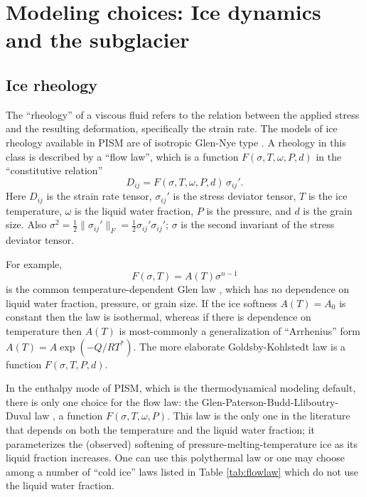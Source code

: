 
\section{Modeling choices:  Ice dynamics and the subglacier}
\label{sec:modeling-dynamics}

\subsection{Ice rheology}
\label{sec:rheology}

The ``rheology'' of a viscous fluid refers to the relation between the applied stress and the resulting deformation, specifically the strain rate.  The models of ice rheology available in PISM are of isotropic Glen-Nye type \cite{Paterson}.   A rheology in this class is described by a ``flow law'', which is a function $F(\sigma,T,\omega,P,d)$ in the ``constitutive relation''
\begin{equation}
D_{ij} = F(\sigma,T,\omega,P,d)\, \sigma_{ij}'.  \label{eq:constitutive}
\end{equation}
Here $D_{ij}$ is the strain rate tensor, $\sigma_{ij}'$ is the stress deviator tensor, $T$ is the ice temperature, $\omega$ is the liquid water fraction, $P$ is the pressure, and $d$ is the grain size.  Also $\sigma^2 = \frac{1}{2} \|\sigma_{ij}'\|_F = \frac{1}{2} \sigma_{ij}' \sigma_{ij}'$; $\sigma$ is the second invariant of the stress deviator tensor.

For example,
\begin{equation}
F(\sigma,T) = A(T) \sigma^{n-1}  \label{eq:isothermalglen}
\end{equation}
is the common temperature-dependent Glen law \cite{PatersonBudd,BBL}, which has no dependence on liquid water fraction, pressure, or grain size.  If the ice softness $A(T)=A_0$ is constant then the law is isothermal, whereas if there is dependence on temperature then $A(T)$ is most-commonly a generalization of ``Arrhenius'' form $A(T) = A \exp(-Q/RT^*)$.  The more elaborate Goldsby-Kohlstedt law \cite{GoldsbyKohlstedt} is a function $F(\sigma,T,P,d)$.

In the enthalpy mode of PISM, which is the thermodynamical modeling default, there is only one choice for the flow law: the Glen-Paterson-Budd-Lliboutry-Duval law \cite{AschwandenBuelerKhroulevBlatter,LliboutryDuval1985,PatersonBudd}, a function $F(\sigma,T,\omega,P)$.  This law is the only one in the literature that depends on both the temperature and the liquid water fraction; it parameterizes the (observed) softening of pressure-melting-temperature ice as its liquid fraction increases.  One can use this polythermal law or one may choose among a number of ``cold ice'' laws listed in Table \ref{tab:flowlaw} which do not use the liquid water fraction.  

